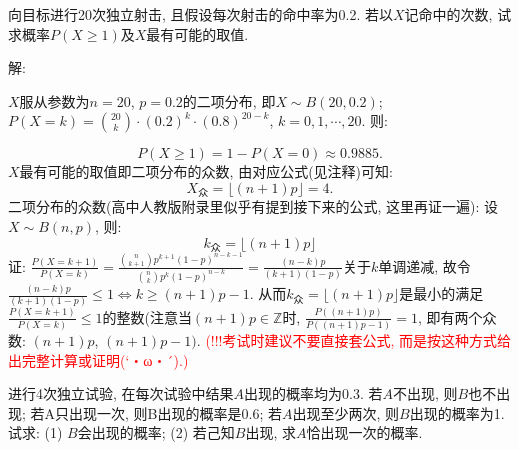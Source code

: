\documentclass[standard]{ExBook}
\begin{document}
\begin{qitems}
\vspace{-5em}

    \begin{bbox}
    \begin{shaded}
        \qitem
向目标进行20次独立射击, 且假设每次射击的命中率为0.2. 若以$X$记命中的次数, 试求概率$P(X \geq 1)$及$X$最有可能的取值.
    \end{shaded}
    \end{bbox}

\vspace{-5em}

    \begin{bbox}
解: 

$X$服从参数为$n=20$, $p=0.2$的二项分布, 即$X\sim B(20,0.2)$; $P(X=k)=\binom{20}{k}\cdot(0.2)^k\cdot(0.8)^{20-k}$, $k=0,1,\cdots,20$. 则:
    \end{bbox}
    
\vspace{-5em}

    \begin{bbox}
$$P(X \geq 1)=1-P(X=0)\approx0.9885.$$
$X$最有可能的取值即二项分布的众数, 由对应公式\textcolor{themeColor}{(见注释)}可知:
$$X_{\text{众}}=\lfloor(n+1)p\rfloor=4.$$
\textcolor{themeColor}{\selectfont {} 二项分布的众数(高中人教版附录里似乎有提到接下来的公式, 这里再证一遍): 设$X\sim B(n,p)$, 则:
$$k_{\text{众}}=\lfloor(n+1)p\rfloor$$
证: $\displaystyle\frac{P(X=k+1)}{P(X=k)}=\frac{\binom{n}{k+1}p^{k+1}(1-p)^{n-k-1}}{\binom{n}{k}p^{k}(1-p)^{n-k}}=\frac{(n-k)p}{(k+1)(1-p)}$关于$k$单调递减, 故令$\displaystyle\frac{(n-k)p}{(k+1)(1-p)} \leq 1 \Longleftrightarrow k \geq (n+1)p-1$. 从而$k_{\text{众}}=\lfloor(n+1)p\rfloor$是最小的满足$\displaystyle\frac{P(X=k+1)}{P(X=k)} \leq 1$的整数(注意当$(n+1)p\in\mathbb{Z}$时, $\frac{P((n+1)p)}{P((n+1)p-1)}=1$, 即有两个众数: $(n+1)p$, $(n+1)p-1)$.} \textcolor{red}{(!!!考试时建议不要直接套公式, 而是按这种方式给出完整计算或证明(`・ω・´).)}
    \end{bbox}

\vspace{-5em}

    \begin{bbox}
    \begin{shaded}
        \qitem
进行4次独立试验, 在每次试验中结果$A$出现的概率均为0.3. 若$A$不出现, 则$B$也不出现; 若A只出现一次, 则B出现的概率是0.6; 若$A$出现至少两次, 则$B$出现的概率为1. 试求: (1) $B$会出现的概率; (2) 若己知$B$出现, 求$A$恰出现一次的概率.
    \end{shaded}
    \end{bbox}


\end{qitems}
\end{document}
